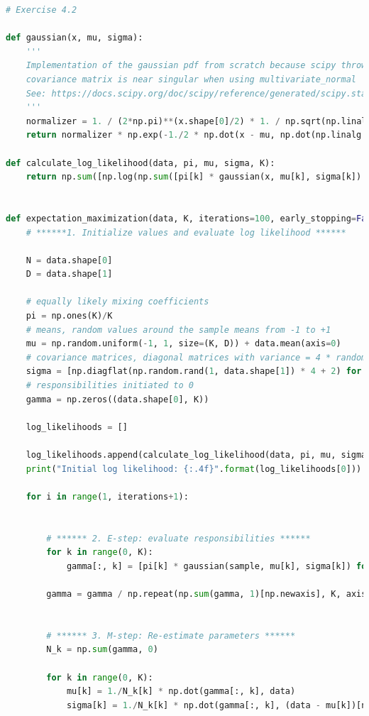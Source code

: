 \documentclass[a4paper]{article}
\begin{document}
\begin{lstlisting}[language=Python]
# Exercise 4.2

def gaussian(x, mu, sigma):
    '''
    Implementation of the gaussian pdf from scratch because scipy throws LinAlgErr when
    covariance matrix is near singular when using multivariate_normal
    See: https://docs.scipy.org/doc/scipy/reference/generated/scipy.stats.multivariate_normal.html
    '''
    normalizer = 1. / (2*np.pi)**(x.shape[0]/2) * 1. / np.sqrt(np.linalg.det(sigma))
    return normalizer * np.exp(-1./2 * np.dot(x - mu, np.dot(np.linalg.inv(sigma), x - mu)))

def calculate_log_likelihood(data, pi, mu, sigma, K):
    return np.sum([np.log(np.sum([pi[k] * gaussian(x, mu[k], sigma[k]) for k in range(0, K)])) for x in data])


def expectation_maximization(data, K, iterations=100, early_stopping=False, epsilon=0.01):
    # ******1. Initialize values and evaluate log likelihood ****** 
    
    N = data.shape[0]
    D = data.shape[1]
    
    # equally likely mixing coefficients
    pi = np.ones(K)/K 
    # means, random values around the sample means from -1 to +1
    mu = np.random.uniform(-1, 1, size=(K, D)) + data.mean(axis=0) 
    # covariance matrices, diagonal matrices with variance = 4 * random + 2
    sigma = [np.diagflat(np.random.rand(1, data.shape[1]) * 4 + 2) for _ in range(0, K)]
    # responsibilities initiated to 0
    gamma = np.zeros((data.shape[0], K))
    
    log_likelihoods = []
    
    log_likelihoods.append(calculate_log_likelihood(data, pi, mu, sigma, K))
    print("Initial log likelihood: {:.4f}".format(log_likelihoods[0]))
    
    for i in range(1, iterations+1):
    
        
        # ****** 2. E-step: evaluate responsibilities ****** 
        for k in range(0, K):
            gamma[:, k] = [pi[k] * gaussian(sample, mu[k], sigma[k]) for sample in data]

        gamma = gamma / np.repeat(np.sum(gamma, 1)[np.newaxis], K, axis=0).T
    

        # ****** 3. M-step: Re-estimate parameters ****** 
        N_k = np.sum(gamma, 0)
        
        for k in range(0, K):
            mu[k] = 1./N_k[k] * np.dot(gamma[:, k], data)
            sigma[k] = 1./N_k[k] * np.dot(gamma[:, k], (data - mu[k])[np.newaxis].T * (data - mu[k])[np.newaxis])


\end{lstlisting}
\end{document}
